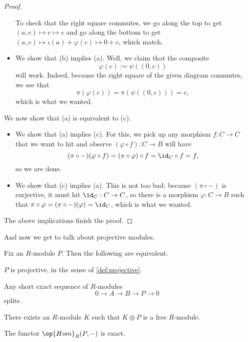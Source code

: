 \begin{proof}
\begin{itemize}
		To check that the right square commutes, we go along the top to get $(a,c)\mapsto c\mapsto c$ and go along the bottom to get $(a,c)\mapsto\iota(a)+\varphi(c)\mapsto 0+c$, which match.

		\item We show that (b) implies (a). Well, we claim that the composite
		\[\varphi(c):=\psi((0,c))\]
		will work. Indeed, because the right square of the given diagram commutes, we see that
		\[\pi(\varphi(c))=\pi(\psi((0,c)))=c,\]
		which is what we wanted.
	\end{itemize}
	We now show that (a) is equivalent to (c).
	\begin{itemize}
		\item We show that (a) implies (c). For this, we pick up any morphism $f:C\to C$ that we want to hit and observe $(\varphi\circ f):C\to B$ will have
		\[(\pi\circ-)(\varphi\circ f)=(\pi\circ\varphi)\circ f=\id_C\circ f=f,\]
		so we are done.
		
		\item We show that (c) implies (a). This is not too bad: because $(\pi\circ-)$ is surjective, it must hit $\id_C:C\to C$, so there is a morphism $\varphi:C\to B$ such that $\pi\circ\varphi=(\pi\circ-)(\varphi)=\id_C$, which is what we wanted.
	\end{itemize}
	The above implications finish the proof.
\end{proof}
And now we get to talk about projective modules.
\begin{lemma} \label{lem:projgrabbag}
	Fix an $R$-module $P$. Then the following are equivalent.
	\begin{listalph}
		\item $P$ is projective, in the sense of \autoref{def:projective}.
		\item Any short exact sequence of $R$-modules
		\[0\to A\to B\to P\to 0\]
		splits.
		\item There exists an $R$-module $K$ such that $K\oplus P$ is a free $R$-module.
		\item The functor $\op{Hom}_R(P,-)$ is exact.
	\end{listalph}
\end{lemma}
